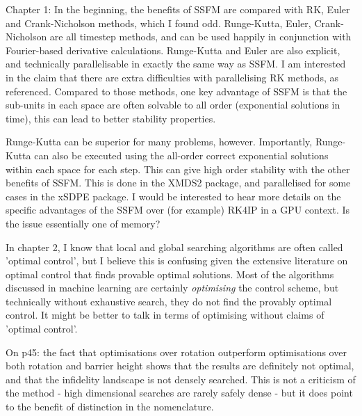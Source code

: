 \documentclass[11pt]{article}
\begin{document}
Chapter 1: In the beginning, the benefits of SSFM are compared with RK, Euler and Crank-Nicholson methods, which I found odd. Runge-Kutta, Euler, Crank-Nicholson are all timestep methods, and can be used happily in conjunction with Fourier-based derivative calculations. Runge-Kutta and Euler are also explicit, and technically parallelisable in exactly the same way as SSFM. I am interested in the claim that there are extra difficulties with parallelising RK methods, as referenced. Compared to those methods, one key advantage of SSFM is that the sub-units in each space are often solvable to all order (exponential solutions in time), this can lead to better stability properties.

Runge-Kutta can be superior for many problems, however. Importantly, Runge-Kutta can also be executed using the all-order correct exponential solutions within each space for each step. This can give high order stability with the other benefits of SSFM. This is done in the XMDS2 package, and parallelised for some cases in the xSDPE package. I would be interested to hear more details on the specific advantages of the SSFM over (for example) RK4IP in a GPU context. Is the issue essentially one of memory?


In chapter 2, I know that local and global searching algorithms are often called 'optimal control', but I believe this is confusing given the extensive literature on optimal control that finds provable optimal solutions. Most of the algorithms discussed in machine learning are certainly \textit{optimising} the control scheme, but technically without exhaustive search, they do not find the provably optimal control. It might be better to talk in terms of optimising without claims of 'optimal control'.

On p45: the fact that optimisations over rotation outperform optimisations over both rotation and barrier height shows that the results are definitely not optimal, and that the infidelity landscape is not densely searched. This is not a criticism of the method - high dimensional searches are rarely safely dense - but it does point to the benefit of distinction in the nomenclature.
\end{document}
